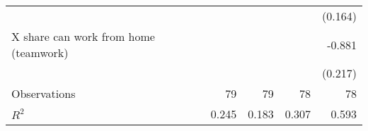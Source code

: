 {\begin{tabular}{l*{4}{D{.}{.}{-1}}}
                    &                     &                     &                     &     (0.164)         \\
[1em]
   X share can work from home (teamwork)&                     &                     &                     &      -0.881\sym{***}\\
                    &                     &                     &                     &     (0.217)         \\
\hline
Observations        &          79         &          79         &          78         &          78         \\
\(R^{2}\)           &       0.245         &       0.183         &       0.307         &       0.593         \\
\hline\hline
\end{tabular}
}
